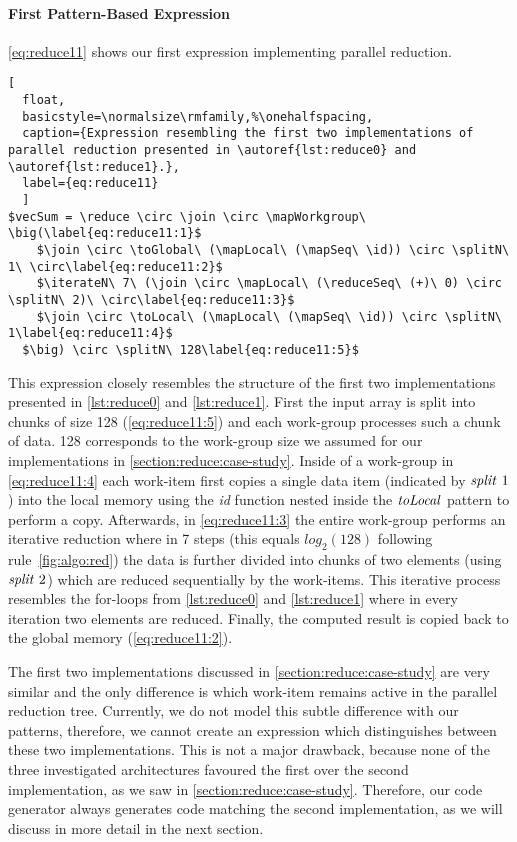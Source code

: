 \paragraph{First Pattern-Based Expression}
\autoref{eq:reduce11} shows our first expression implementing parallel reduction.
\begin{lstlisting}[
  float,
  basicstyle=\normalsize\rmfamily,%\onehalfspacing,
  caption={Expression resembling the first two implementations of parallel reduction presented in \autoref{lst:reduce0} and \autoref{lst:reduce1}.},
  label={eq:reduce11}
  ]
$vecSum = \reduce \circ \join \circ \mapWorkgroup\ \big(\label{eq:reduce11:1}$
    $\join \circ \toGlobal\ (\mapLocal\ (\mapSeq\ \id)) \circ \splitN\ 1\ \circ\label{eq:reduce11:2}$
    $\iterateN\ 7\ (\join \circ \mapLocal\ (\reduceSeq\ (+)\ 0) \circ \splitN\ 2)\ \circ\label{eq:reduce11:3}$
    $\join \circ \toLocal\ (\mapLocal\ (\mapSeq\ \id)) \circ \splitN\ 1\label{eq:reduce11:4}$
  $\big) \circ \splitN\ 128\label{eq:reduce11:5}$
\end{lstlisting}
%
This expression closely resembles the structure of the first two implementations presented in \autoref{lst:reduce0} and \autoref{lst:reduce1}.
First the input array is split into chunks of size 128 (\autoref{eq:reduce11:5}) and each work-group processes such a chunk of data.
128 corresponds to the work-group size we assumed for our implementations in \autoref{section:reduce:case-study}.
Inside of a work-group in \autoref{eq:reduce11:4} each work-item first copies a single data item (indicated by $\text{\textit{split}}\ 1$) into the local memory using the \textit{id} function nested inside the $\text{\textit{toLocal}}$ pattern to perform a copy.
Afterwards, in \autoref{eq:reduce11:3} the entire work-group performs an iterative reduction where in 7 steps (this equals $log_2(128)$ following rule~\ref{fig:algo:red}) the data is further divided into chunks of two elements (using $\text{\textit{split}}\ 2$) which are reduced sequentially by the work-items.
This iterative process resembles the for-loops from \autoref{lst:reduce0} and \autoref{lst:reduce1} where in every iteration two elements are reduced.
Finally, the computed result is copied back to the global memory (\autoref{eq:reduce11:2}).

The first two implementations discussed in \autoref{section:reduce:case-study} are very similar and the only difference is which work-item remains active in the parallel reduction tree.
Currently, we do not model this subtle difference with our patterns, therefore, we cannot create an expression which distinguishes between these two implementations.
This is not a major drawback, because none of the three investigated architectures favoured the first over the second implementation, as we saw in \autoref{section:reduce:case-study}.
Therefore, our code generator always generates code matching the second implementation, as we will discuss in more detail in the next section.


